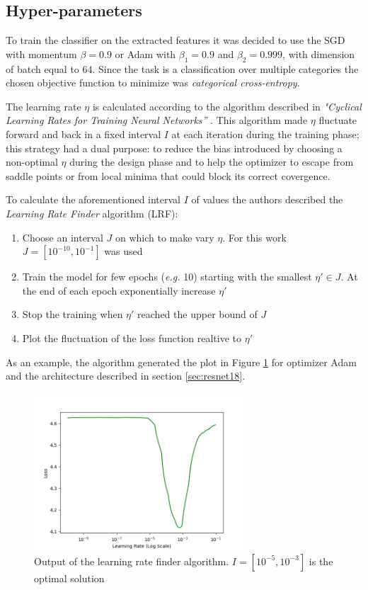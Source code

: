 \subsection{Hyper-parameters}
To train the classifier on the extracted features it was decided to use the SGD \cite{kiefer1952} with momentum $\beta = 0.9$ or Adam \cite{kingma2014adam} with $\beta_1 = 0.9$ and $\beta_2 = 0.999$, with dimension of
batch equal to $64$.
Since the task is a classification over multiple categories the chosen objective function to minimize was \emph{categorical cross-entropy}. \par

The learning rate $\eta$ is calculated according to the algorithm described in \emph{"Cyclical Learning Rates for Training Neural
Networks”} \cite{smith2015cyclical}. This algorithm made $\eta$ fluctuate forward and
back in a fixed interval $I$ at each iteration during the training phase;
this strategy had a dual purpose: to reduce the bias introduced by choosing a non-optimal $\eta$ during the design phase and to help the optimizer to escape from saddle points or 
from local minima that could block its correct covergence.\par

To calculate the aforementioned interval $I$ of values the authors described the \textit{Learning Rate Finder} algorithm (LRF):
\begin{enumerate}
\item{Choose an interval $J$ on which to make vary $\eta$. For this work $J = [10^{-10}, 10^{-1}]$ was used} 
\item{Train the model for few epochs (\textit{e.g.} 10) starting with the smallest ${\eta}' \in J$. At the end of each epoch exponentially increase ${\eta}'$}
\item{Stop the training when ${\eta}'$ reached the upper bound of $J$}
\item{Plot the fluctuation of the loss function realtive to ${\eta}'$}
\end{enumerate}
As an example, the algorithm generated the plot in Figure \ref{fig:lr} for optimizer Adam and the architecture described in section \ref{sec:resnet18}. 
\begin{figure}[ht]
\centering
\includegraphics[width=0.7\textwidth]{images/lr_adam.png} 
\caption{Output of the learning rate finder algorithm. $I=[10^{-5}, 10^{-3}]$ is the optimal solution}
\label{fig:lr}
\end{figure}

